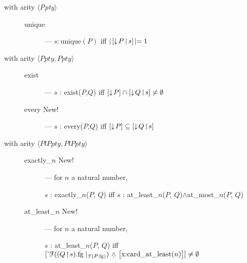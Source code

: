 \begin{description}
  \item[with arity \textnormal{$\langle$\textit{Ppty}$\rangle$}]
    \mbox{}

    \begin{description}
      
    \item[\textnormal{unique}] --- $s:\textrm{unique}(P)$ iff
      $\mid\![\downarrow\!P\!\restriction\!s]\!\mid = 1$

    \end{description}

    \item[with arity \textnormal{$\langle\textit{Ppty},\textit{Ppty}\rangle$}] \mbox{}

  \begin{description}
    
  \item[\textnormal{exist}] ---  $s$ : exist($P$,$Q$) iff
     $[\downarrow\!P]\cap[\downarrow\!Q\!\restriction\! s]\not=\emptyset$
    
  \item[\textnormal{every} New!] --- $s$ : every($P$,$Q$) iff
    $[\downarrow\!P]\subseteq[\downarrow\!Q\!\restriction\!s]$

  \end{description}

  
\item[with arity
  \textnormal{$\langle\textit{PlPpty},\textit{PlPpty}\rangle$}] \mbox{}
  
\begin{description}
    
\item[\textnormal{exactly\_$n$} New!] --- for $n$ a natural number,

  $s$ : exactly\_$n$($P$, $Q$) iff $s$ : at\_least\_$n$($P$, $Q$)$\wedge$at\_most\_$n$($P$, $Q$)


      
    \item[\textnormal{at\_least\_$n$} New!] --- for $n$ a natural
      number,

      $s$ : at\_least\_$n$($P$, $Q$) iff
          $\down{\mathcal{F}((Q\!\restriction\!        s).\text{fg}\mid_{\mathcal{F}(P.\text{fg})})
        \text{ \d{$\wedge$} \smallrecord{\smalltfield{x}{card\_at\_least($n$)}}}}
      \not=\emptyset$


\end{description}
\end{description}
